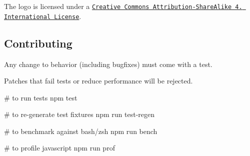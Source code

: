 The logo is licensed under a \href{https://creativecommons.org/licenses/by-sa/4.0/}{\tt Creative Commons Attribution-\/\+Share\+Alike 4. International License}.

\subsection*{Contributing}

Any change to behavior (including bugfixes) must come with a test.

Patches that fail tests or reduce performance will be rejected.


\begin{DoxyCode}
# to run tests
npm test

# to re-generate test fixtures
npm run test-regen

# to benchmark against bash/zsh
npm run bench

# to profile javascript
npm run prof
\end{DoxyCode}
 
